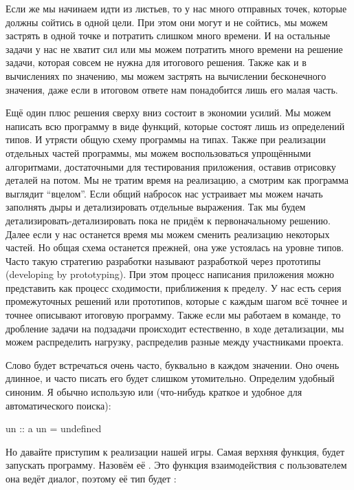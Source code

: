 
Если же мы начинаем идти из листьев, то у нас много отправных точек,
которые должны сойтись в одной цели. При этом они могут и не сойтись, мы
можем застрять в одной точке и потратить слишком много времени. И на
остальные задачи у нас не хватит сил или мы можем потратить много
времени на решение задачи, которая совсем не нужна для итогового
решения. Также как и в вычислениях по значению, мы можем застрять на
вычислении бесконечного значения, даже если в итоговом ответе нам
понадобится лишь его малая часть.

Ещё один плюс решения сверху вниз состоит в экономии усилий. Мы можем
написать всю программу в виде функций, которые состоят лишь из
определений типов. И утрясти общую схему программы на типах. Также при
реализации отдельных частей программы, мы можем воспользоваться
упрощёнными алгоритмами, достаточными для тестирования приложения,
оставив отрисовку деталей на потом. Мы не тратим время на реализацию, а
смотрим как программа выглядит ``вцелом''. Если общий набросок нас
устраивает мы можем начать заполнять дыры и детализировать отдельные
выражения. Так мы будем детализировать-детализировать пока не придём к
первоначальному решению. Далее если у нас останется время мы можем
сменить реализацию некоторых частей. Но общая схема останется прежней,
она уже устоялась на уровне типов. Часто такую стратегию разработки
называют разработкой через прототипы (developing by prototyping). При
этом процесс написания приложения можно представить как процесс
сходимости, приближения к пределу. У нас есть серия промежуточных
решений или прототипов, которые с каждым шагом всё точнее и точнее
описывают итоговую программу. Также если мы работаем в команде, то
дробление задачи на подзадачи происходит естественно, в ходе
детализации, мы можем распределить нагрузку, распределив разные
 между участниками проекта.

Слово  будет встречаться очень часто, буквально в каждом
значении. Оно очень длинное, и часто писать его будет слишком
утомительно. Определим удобный синоним. Я обычно использую  или
 (что-нибудь краткое и удобное для автоматического поиска):


\begin{code}
un :: a
un = undefined
\end{code}

Но давайте приступим к реализации нашей игры. Самая верхняя функция,
будет запускать программу. Назовём её . Это функция
взаимодействия с пользователем она ведёт диалог, поэтому её тип будет
:


